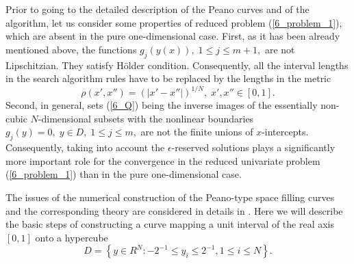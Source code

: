 Prior to going to the detailed description of the Peano curves and of the algorithm, let us consider some properties of reduced problem (\ref{6_problem_1}), which are absent in the pure one-dimensional case. First, as it has been already mentioned above, the functions $g_j(y(x)), \; 1 \leq j \leq m+1,$ are not Lipschitzian. They satisfy H\"older condition. Consequently, all the interval lengths in the search algorithm rules have to be replaced by the lengths in the metric
\[
\rho (x',x'') = \left(\left|x'-x''\right|\right)^{1/N}, \; x',x'' \in [0,1].
\]
Second, in general, sets (\ref{6_Q}) being the inverse images of the essentially non-cubic $N$-dimensional subsets with the nonlinear boundaries $g_j(y)=0, \; y \in D, \; 1\leq j \leq m,$ are not the finite unions of $x$-intercepts. Consequently, taking into account the $\epsilon$-reserved solutions plays a significantly more important role for the convergence in the reduced univariate problem (\ref{6_problem_1}) than in the pure one-dimensional case.

The issues of the numerical construction of the Peano-type space filling curves and the corresponding theory are considered in details in \cite{6_Butz,6_Sagan,6_Strongin2000,6_Strongin2013}. Here we will describe the basic steps of constructing a curve mapping a unit interval of the real axis $[0,1]$ onto a hypercube  
\[
D=\left\{y\in R^N: -2^{-1}\leq y_i \leq 2^{-1}, 1\leq i \leq N \right\}.
\]

